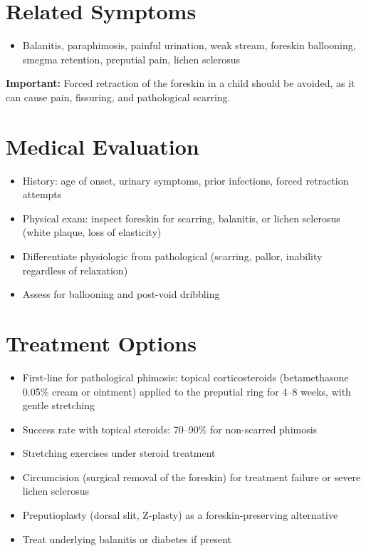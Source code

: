 \section*{Related Symptoms}
\begin{itemize}
  \item Balanitis, paraphimosis, painful urination, weak stream, foreskin ballooning, smegma retention, preputial pain, lichen sclerosus
\end{itemize}
\textbf{Important:} Forced retraction of the foreskin in a child should be avoided, as it can cause pain, fissuring, and pathological scarring.

\section*{Medical Evaluation}
\begin{itemize}
  \item History: age of onset, urinary symptoms, prior infections, forced retraction attempts
  \item Physical exam: inspect foreskin for scarring, balanitis, or lichen sclerosus (white plaque, loss of elasticity)
  \item Differentiate physiologic from pathological (scarring, pallor, inability regardless of relaxation)
  \item Assess for ballooning and post-void dribbling
\end{itemize}

\section*{Treatment Options}
\begin{itemize}
  \item First-line for pathological phimosis: topical corticosteroids (betamethasone 0.05\% cream or ointment) applied to the preputial ring for 4--8 weeks, with gentle stretching
  \item Success rate with topical steroids: 70--90\% for non-scarred phimosis
  \item Stretching exercises under steroid treatment
  \item Circumcision (surgical removal of the foreskin) for treatment failure or severe lichen sclerosus
  \item Preputioplasty (dorsal slit, Z-plasty) as a foreskin-preserving alternative
  \item Treat underlying balanitis or diabetes if present
\end{itemize}

